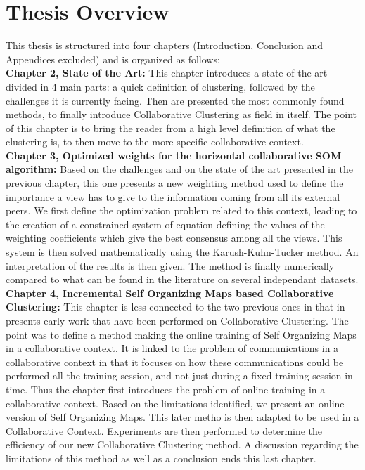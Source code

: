 \section{Thesis Overview}

This thesis is structured into four chapters (Introduction, Conclusion and Appendices excluded) and is organized as follows:\\

\textbf{Chapter 2, State of the Art:} This chapter introduces a state of the art divided in 4 main parts: a quick definition of clustering, followed by the challenges it is currently facing. Then are presented the most commonly found methods, to finally introduce Collaborative Clustering as field in itself. The point of this chapter is to bring the reader from a high level definition of what the clustering is, to then move to the more specific collaborative context.\\

\textbf{Chapter 3, Optimized weights for the horizontal collaborative SOM algorithm:} Based on the challenges and on the state of the art presented in the previous chapter, this one presents a new weighting method used to define the importance a view has to give to the information coming from all its external peers. We first define the optimization problem related to this context, leading to the creation of a constrained system of equation defining the values of the weighting coefficients which give the best consensus among all the views. This system is then solved mathematically using the Karush-Kuhn-Tucker method. An interpretation of the results is then given. The method is finally numerically compared to what can be found in the literature on several independant datasets.\\

\textbf{Chapter 4, Incremental Self Organizing Maps based Collaborative Clustering:} This chapter is less connected to the two previous ones in that in presents early work that have been performed on Collaborative Clustering. The point was to define a method making the online training of Self Organizing Maps in a collaborative context. It is linked to the problem of communications in a collaborative context in that it focuses on how these communications could be performed all the training session, and not just during a fixed training session in time. Thus the chapter first introduces the problem of online training in a collaborative context. Based on the limitations identified, we present an online version of Self Organizing Maps. This later metho is then adapted to be used in a Collaborative Context. Experiments are then performed to determine the efficiency of our new Collaborative Clustering method. A discussion regarding the limitations of this method as well as a conclusion ends this last chapter.\\

